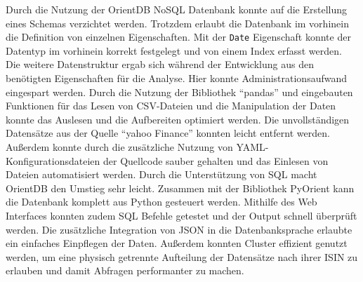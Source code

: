 Durch die Nutzung der OrientDB NoSQL Datenbank konnte auf die Erstellung eines Schemas verzichtet werden. Trotzdem erlaubt die Datenbank im vorhinein die Definition von einzelnen Eigenschaften. Mit der \texttt{Date} Eigenschaft konnte der Datentyp im vorhinein korrekt festgelegt und von einem Index erfasst werden. Die weitere Datenstruktur ergab sich während der Entwicklung aus den benötigten Eigenschaften für die Analyse. Hier konnte Administrationsaufwand eingespart werden. Durch die Nutzung der Bibliothek \enquote{pandas} und eingebauten Funktionen für das Lesen von \gls{CSV}-Dateien und die Manipulation der Daten konnte das Auslesen und die Aufbereiten optimiert werden. Die unvollständigen Datensätze aus der Quelle \enquote{yahoo Finance} konnten leicht entfernt werden. Außerdem konnte durch die zusätzliche Nutzung von \gls{YAML}-Konfigurationsdateien der Quellcode sauber gehalten und das Einlesen von Dateien automatisiert werden. Durch die Unterstützung von \gls{SQL} macht OrientDB den Umstieg sehr leicht. Zusammen mit der Bibliothek PyOrient kann die Datenbank komplett aus Python gesteuert werden. Mithilfe des Web Interfaces konnten zudem \gls{SQL} Befehle getestet und der Output schnell überprüft werden. Die zusätzliche Integration von \gls{JSON} in die Datenbanksprache erlaubte ein einfaches Einpflegen der Daten. Außerdem konnten Cluster effizient genutzt werden, um eine physisch getrennte Aufteilung der Datensätze nach ihrer \gls{ISIN} zu erlauben und damit Abfragen performanter zu machen.

\clearpage